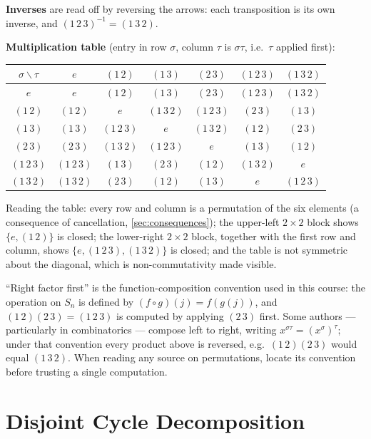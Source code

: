 \documentclass[11pt]{report}
\begin{document}
\begin{exbox}
\textbf{Inverses} are read off by reversing the arrows: each transposition is its own inverse, and $(1\,2\,3)^{-1} = (1\,3\,2)$.

\textbf{Multiplication table} (entry in row $\sigma$, column $\tau$ is $\sigma\tau$, i.e.\ $\tau$ applied first):
\begin{center}
\begin{tabular}{c|cccccc}
$\sigma \backslash \tau$ & $e$ & $(1\,2)$ & $(1\,3)$ & $(2\,3)$ & $(1\,2\,3)$ & $(1\,3\,2)$ \\ \hline
$e$ & $e$ & $(1\,2)$ & $(1\,3)$ & $(2\,3)$ & $(1\,2\,3)$ & $(1\,3\,2)$ \\
$(1\,2)$ & $(1\,2)$ & $e$ & $(1\,3\,2)$ & $(1\,2\,3)$ & $(2\,3)$ & $(1\,3)$ \\
$(1\,3)$ & $(1\,3)$ & $(1\,2\,3)$ & $e$ & $(1\,3\,2)$ & $(1\,2)$ & $(2\,3)$ \\
$(2\,3)$ & $(2\,3)$ & $(1\,3\,2)$ & $(1\,2\,3)$ & $e$ & $(1\,3)$ & $(1\,2)$ \\
$(1\,2\,3)$ & $(1\,2\,3)$ & $(1\,3)$ & $(2\,3)$ & $(1\,2)$ & $(1\,3\,2)$ & $e$ \\
$(1\,3\,2)$ & $(1\,3\,2)$ & $(2\,3)$ & $(1\,2)$ & $(1\,3)$ & $e$ & $(1\,2\,3)$
\end{tabular}
\end{center}
Reading the table: every row and column is a permutation of the six elements (a consequence of cancellation, \ref{sec:consequences}); the upper-left $2 \times 2$ block shows $\{e, (1\,2)\}$ is closed; the lower-right $2 \times 2$ block, together with the first row and column, shows $\{e, (1\,2\,3), (1\,3\,2)\}$ is closed; and the table is not symmetric about the diagonal, which is non-commutativity made visible.
\end{exbox}

\begin{rembox}\label{rem:convention-warning}
``Right factor first'' is the function-composition convention used in this course: the operation on $S_n$ is defined by $(f \circ g)(j) = f(g(j))$, and $(1\,2)(2\,3) = (1\,2\,3)$ is computed by applying $(2\,3)$ first. Some authors --- particularly in combinatorics --- compose left to right, writing $x^{\sigma\tau} = (x^\sigma)^\tau$; under that convention every product above is reversed, e.g.\ $(1\,2)(2\,3)$ would equal $(1\,3\,2)$. When reading any source on permutations, locate its convention before trusting a single computation.
\end{rembox}

\section{Disjoint Cycle Decomposition}\label{sec:disjoint}
\end{document}
